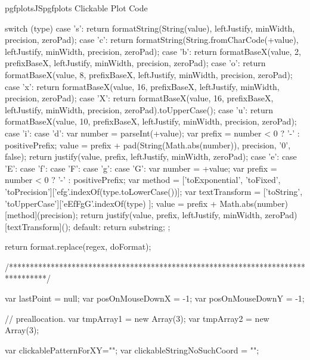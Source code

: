 \begin{insDLJS}[processAnnotatedPlot]{pgfplotsJS}{pgfplots Clickable Plot Code}
{{        switch (type) {
            case 's': return formatString(String(value), leftJustify, minWidth, precision, zeroPad);
            case 'c': return formatString(String.fromCharCode(+value), leftJustify, minWidth, precision, zeroPad);
            case 'b': return formatBaseX(value, 2, prefixBaseX, leftJustify, minWidth, precision, zeroPad);
            case 'o': return formatBaseX(value, 8, prefixBaseX, leftJustify, minWidth, precision, zeroPad);
            case 'x': return formatBaseX(value, 16, prefixBaseX, leftJustify, minWidth, precision, zeroPad);
            case 'X': return formatBaseX(value, 16, prefixBaseX, leftJustify, minWidth, precision, zeroPad).toUpperCase();
            case 'u': return formatBaseX(value, 10, prefixBaseX, leftJustify, minWidth, precision, zeroPad);
            case 'i':
            case 'd': {
                        var number = parseInt(+value);
                        var prefix = number < 0 ? '-' : positivePrefix;
                        value = prefix + pad(String(Math.abs(number)), precision, '0', false);
                        return justify(value, prefix, leftJustify, minWidth, zeroPad);
                    }
            case 'e':
            case 'E':
            case 'f':
            case 'F':
            case 'g':
            case 'G':
                        {
                        var number = +value;
                        var prefix = number < 0 ? '-' : positivePrefix;
                        var method = ['toExponential', 'toFixed', 'toPrecision']['efg'.indexOf(type.toLowerCase())];
                        var textTransform = ['toString', 'toUpperCase']['eEfFgG'.indexOf(type) ];
                        value = prefix + Math.abs(number)[method](precision);
                        return justify(value, prefix, leftJustify, minWidth, zeroPad)[textTransform]();
                    }
            default: return substring;
        }
    };

    return format.replace(regex, doFormat);
}
/*********************************************************************************/


var lastPoint = null;
var posOnMouseDownX = -1;
var posOnMouseDownY = -1;

// preallocation.
var tmpArray1 = new Array(3);
var tmpArray2 = new Array(3);

var clickablePatternForXY="";
var clickableStringNoSuchCoord = "";


\end{insDLJS}
